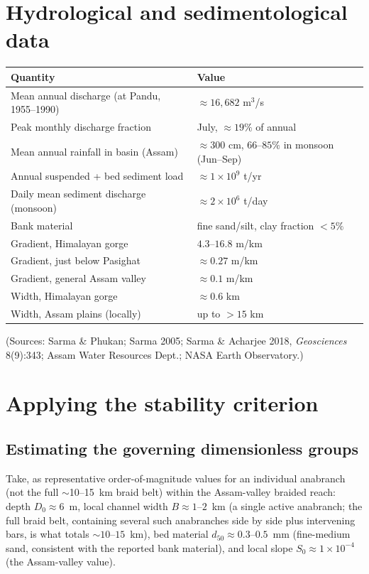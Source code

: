 \documentclass[11pt,a4paper]{report}
\theoremstyle{definition}
\theoremstyle{plain}
\theoremstyle{remark}
\begin{document}
\section{Hydrological and sedimentological data}
\begin{center}
\begin{tabular}{@{}p{7.6cm}p{5.4cm}@{}}
\toprule
\textbf{Quantity} & \textbf{Value} \\
\midrule
Mean annual discharge (at Pandu, 1955--1990) & $\approx 16{,}682$ m$^3$/s \\
Peak monthly discharge fraction & July, $\approx19\%$ of annual \\
Mean annual rainfall in basin (Assam) & $\approx 300$ cm, $66$--$85\%$ in monsoon (Jun--Sep) \\
Annual suspended + bed sediment load & $\approx 1 \times 10^{9}$ t/yr \\
Daily mean sediment discharge (monsoon) & $\approx 2\times10^{6}$ t/day \\
Bank material & fine sand/silt, clay fraction $<5\%$ \\
Gradient, Himalayan gorge & $4.3$--$16.8$ m/km \\
Gradient, just below Pasighat & $\approx0.27$ m/km \\
Gradient, general Assam valley & $\approx0.1$ m/km \\
Width, Himalayan gorge & $\approx0.6$ km \\
Width, Assam plains (locally) & up to $>15$ km \\
\bottomrule
\end{tabular}
\end{center}
(Sources: Sarma \& Phukan; Sarma 2005; Sarma \& Acharjee 2018, \emph{Geosciences} 8(9):343; Assam Water Resources Dept.; NASA Earth Observatory.)

\section{Applying the stability criterion}
\subsection{Estimating the governing dimensionless groups}
Take, as representative order-of-magnitude values for an individual anabranch (not the full $\sim$10--15~km braid belt) within the Assam-valley braided reach: depth $D_0\approx6$~m, local channel width $B\approx1$--$2$~km (a single active anabranch; the full braid belt, containing several such anabranches side by side plus intervening bars, is what totals $\sim10$--$15$~km), bed material $d_{50}\approx0.3$--$0.5$~mm (fine-medium sand, consistent with the reported bank material), and local slope $S_0\approx1\times10^{-4}$ (the Assam-valley value).
\end{document}
